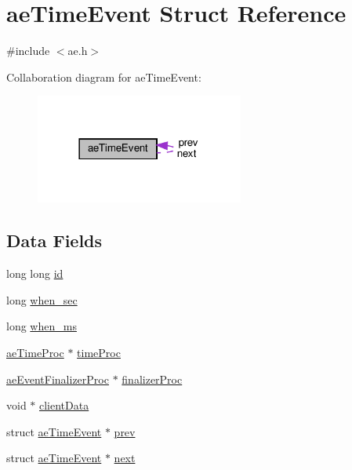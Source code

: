 \hypertarget{structae_time_event}{}\section{ae\+Time\+Event Struct Reference}
\label{structae_time_event}


{\ttfamily \#include $<$ae.\+h$>$}



Collaboration diagram for ae\+Time\+Event\+:
\nopagebreak
\begin{figure}[H]
\begin{center}
\leavevmode
\includegraphics[width=194pt]{structae_time_event__coll__graph}
\end{center}
\end{figure}
\subsection*{Data Fields}
\begin{DoxyCompactItemize}
\item 
long long \hyperlink{structae_time_event_ab87bfb64728d3251718dbf51ef534b60}{id}
\item 
long \hyperlink{structae_time_event_a512e40dee841595f330e13fdca5f850c}{when\+\_\+sec}
\item 
long \hyperlink{structae_time_event_a416251c056e9c8a78fa667370f2cd30c}{when\+\_\+ms}
\item 
\hyperlink{ae_8h_a09cb08f0aea5e5c1460a8b8599d789c8}{ae\+Time\+Proc} $\ast$ \hyperlink{structae_time_event_a93b11f52b154bc10722b6d0e69acc9fb}{time\+Proc}
\item 
\hyperlink{ae_8h_a82c64cc6b7c71e2b7bae4e6b18f42c54}{ae\+Event\+Finalizer\+Proc} $\ast$ \hyperlink{structae_time_event_ac3fd2be96fd0c8c3f4fe9aff811afb80}{finalizer\+Proc}
\item 
void $\ast$ \hyperlink{structae_time_event_a31433b6f2825807bd6d9c0675ff7c4cb}{client\+Data}
\item 
struct \hyperlink{structae_time_event}{ae\+Time\+Event} $\ast$ \hyperlink{structae_time_event_ada581f66d2dd621d24aaba80b0d36ad8}{prev}
\item 
struct \hyperlink{structae_time_event}{ae\+Time\+Event} $\ast$ \hyperlink{structae_time_event_a9210aa4aa97ad7cba5770e567b8fd961}{next}
\end{DoxyCompactItemize}


